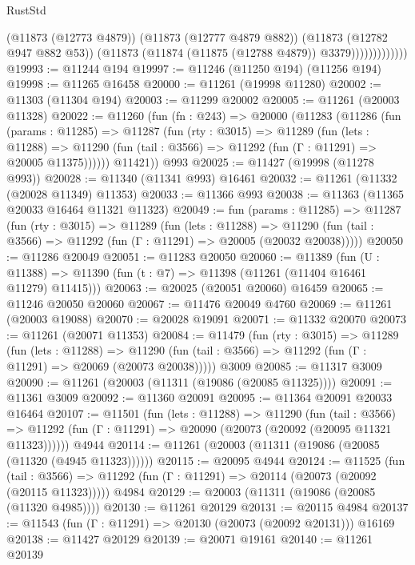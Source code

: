 \begin{lexlean}{RustStd}
\begin{coremodule}
                          (@11873 (@12773 @4879))
                          (@11873 (@12777 @4879 @882))
                          (@11873 (@12782 @947 @882 @53))
                          (@11873 (@11874 (@11875 (@12788 @4879)) @3379)))))))))))))
@19993 := @11244 @194
@19997 := @11246 (@11250 @194) (@11256 @194)
@19998 := @11265 @16458
@20000 := @11261 (@19998 @11280)
@20002 := @11303 (@11304 @194)
@20003 := @11299 @20002
@20005 := @11261 (@20003 @11328)
@20022 := @11260
    (fun (fn : @243) =>
    @20000
      (@11283
        (@11286
          (fun (params : @11285) =>
          @11287
            (fun (rty : @3015) =>
            @11289
              (fun (lets : @11288) =>
              @11290 (fun (tail : @3566) => @11292 (fun (Γ : @11291) => @20005 @11375))))))
        @11421))
    @993
@20025 := @11427 (@19998 (@11278 @993))
@20028 := @11340 (@11341 @993) @16461
@20032 := @11261 (@11332 (@20028 @11349) @11353)
@20033 := @11366 @993
@20038 := @11363 (@11365 @20033 @16464 @11321 @11323)
@20049 := fun (params : @11285) =>
  @11287
    (fun (rty : @3015) =>
    @11289
      (fun (lets : @11288) =>
      @11290 (fun (tail : @3566) => @11292 (fun (Γ : @11291) => @20005 (@20032 @20038)))))
@20050 := @11286 @20049
@20051 := @11283 @20050
@20060 := @11389
    (fun (U : @11388) => @11390 (fun (t : @7) => @11398 (@11261 (@11404 @16461 @11279) @11415)))
@20063 := @20025 (@20051 @20060) @16459
@20065 := @11246 @20050 @20060
@20067 := @11476 @20049 @4760
@20069 := @11261 (@20003 @19088)
@20070 := @20028 @19091
@20071 := @11332 @20070
@20073 := @11261 (@20071 @11353)
@20084 := @11479
    (fun (rty : @3015) =>
    @11289
      (fun (lets : @11288) =>
      @11290 (fun (tail : @3566) => @11292 (fun (Γ : @11291) => @20069 (@20073 @20038)))))
    @3009
@20085 := @11317 @3009
@20090 := @11261 (@20003 (@11311 (@19086 (@20085 @11325))))
@20091 := @11361 @3009
@20092 := @11360 @20091
@20095 := @11364 @20091 @20033 @16464
@20107 := @11501
    (fun (lets : @11288) =>
    @11290
      (fun (tail : @3566) =>
      @11292 (fun (Γ : @11291) => @20090 (@20073 (@20092 (@20095 @11321 @11323))))))
    @4944
@20114 := @11261 (@20003 (@11311 (@19086 (@20085 (@11320 (@4945 @11323))))))
@20115 := @20095 @4944
@20124 := @11525
    (fun (tail : @3566) => @11292 (fun (Γ : @11291) => @20114 (@20073 (@20092 (@20115 @11323)))))
    @4984
@20129 := @20003 (@11311 (@19086 (@20085 (@11320 @4985))))
@20130 := @11261 @20129
@20131 := @20115 @4984
@20137 := @11543 (fun (Γ : @11291) => @20130 (@20073 (@20092 @20131))) @16169
@20138 := @11427 @20129
@20139 := @20071 @19161
@20140 := @11261 @20139

\end{coremodule}
\end{lexlean}
